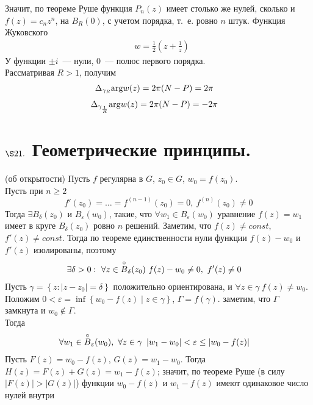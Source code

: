 Значит, по теореме Руше функция $P_n(z)$ имеет столько же нулей, сколько и $f(z)
= c_nz^n$, на $B_R(0)$, с учетом порядка, т.~е. ровно $n$ штук.
\Example
Функция Жуковского
\begin{align*}
  & w = \frac{1}{2}\left( z+\frac{1}{z} \right)
\end{align*}
У функции $\pm i$~--- нули, $0$~--- полюс первого порядка.
\\
Рассматривая $R>1$, получим
\begin{align*}
  & \Delta_{\gamma_R}\mathrm{arg} w(z) = 2 \pi (N-P) = 2\pi
\end{align*}
\begin{align*}
  & \Delta_{\gamma_{\frac{1}{R}}}\mathrm{arg} w(z) = 2 \pi (N-P) = -2\pi
\end{align*}
\section{$\S 21.$ Геометрические принципы.}
\lemma (об открытости)
Пусть $f$ регулярна в $G$, $z_0 \in G$, $w_0 = f(z_0)$.
\\
Пусть при $n \geq 2$
\begin{equation}\label{(20.1)}
    f'(z_0) = \dots = f^{(n-1)}(z_0) = 0, \ f^{(n)}(z_0) \neq 0
\end{equation}
Тогда $\exists B_\delta(z_0)$ и $B_\varepsilon(w_0)$, такие, что $\forall w_1
\in B_{\varepsilon}(w_0)$ уравнение $f(z) = w_1$ имеет в круге $B_\delta(z_0)$
ровно $n$ решений.
\pr
Заметим, что $f(z) \neq const$, $f'(z) \neq const$. Тогда по теореме
единственности нули функции $f(z)-w_0$ и $f'(z)$ изолированы, поэтому
\begin{align*}
& \exists \delta > 0: \ \forall z \in \os{\circ}B_\delta(z_0) \ f(z)-w_0 \neq 0, \ f'(z) \neq 0
\end{align*}
Пусть $\gamma = \left\{ z: \left| z-z_0 \right| = \delta \right\}$ положительно
ориентирована, и $\forall z \in \gamma \ f(z)\neq w_0$. Положим $0 < \varepsilon
= \inf \left\{ w_0 - f(z) \mid z \in \gamma \right\}$, $\Gamma = f(\gamma)$.
заметим, что $\Gamma$ замкнута и $w_0 \not \in \Gamma$.
\\
Тогда
\begin{align*}
& \forall w_1 \in \overset{\circ}{B}_\varepsilon(w_0), \ \forall z \in \gamma \ \left| w_1-w_0 \right| < \varepsilon \leq \left| w_0 - f(z) \right|
\end{align*}
Пусть $F(z) = w_0 - f(z)$, $G(z) = w_1-w_0$. Тогда $H(z) = F(z)+G(z) =
w_1-f(z)$; значит, по теореме Руше (в силу $\left| F(z) \right|> \left| G(z)
\right|$) функции $w_0 - f(z)$ и $w_1-f(z)$ имеют одинаковое число нулей внутри

